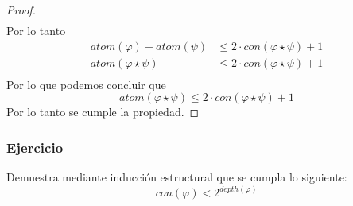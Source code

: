 \documentclass[a4paper]{article}
\begin{document}
\begin{proof}
\begin{align*}
    \end{align*}
    Por lo tanto
    \begin{align*}
        atom\left(\varphi\right) + atom\left(\psi\right) &\leq 2 \cdot con\left(\varphi \star \psi\right) + 1 \\
        atom\left(\varphi \star \psi\right) &\leq 2 \cdot con\left(\varphi \star \psi\right) + 1 \\
    \end{align*}
    Por lo que podemos concluir que
    \[
        atom\left(\varphi \star \psi\right) \leq 2 \cdot con\left(\varphi \star \psi\right) + 1
    \]
    Por lo tanto se cumple la propiedad.
\end{proof}
\subsubsection{Ejercicio}
\noindent
Demuestra mediante inducción estructural que se cumpla lo siguiente:
\[
    con\left(\varphi\right) < 2^{depth\left(\varphi\right)}
\]
\end{document}
